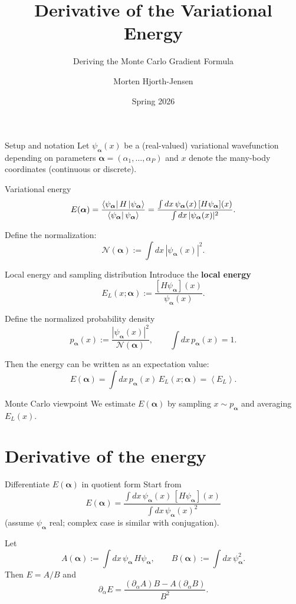 \documentclass[aspectratio=169]{beamer}
\title{Derivative of the Variational Energy}
\subtitle{Deriving the Monte Carlo Gradient Formula}
\author{Morten Hjorth-Jensen}
\date{Spring 2026}
\newcommand{\avg}[1]{\left\langle #1 \right\rangle}
\newcommand{\psia}{\psi_{\bm{\alpha}}}
\newcommand{\dalpha}{\partial_{\alpha}}
\newcommand{\El}{E_L}
\begin{document}
\begin{frame}
\titlepage
\end{frame}

\begin{frame}{Setup and notation}
Let $\psia(x)$ be a (real-valued) variational wavefunction depending on parameters
$\bm{\alpha}=(\alpha_1,\dots,\alpha_P)$ and $x$ denote the many-body coordinates (continuous or discrete).

\begin{block}{Variational energy}
\[
E(\bm{\alpha})=\frac{\bra{\psia}H\ket{\psia}}{\bra{\psia}\psia\rangle}
=
\frac{\int dx\, \psia(x)\, [H\psia](x)}{\int dx\, |\psia(x)|^2}.
\]
\end{block}

Define the normalization:
\[
\mathcal{N}(\bm{\alpha}) := \int dx\, |\psia(x)|^2.
\]
\end{frame}

\begin{frame}{Local energy and sampling distribution}
Introduce the \textbf{local energy}
\[
\El(x;\bm{\alpha}) := \frac{[H\psia](x)}{\psia(x)}.
\]

Define the normalized probability density
\[
p_{\bm{\alpha}}(x) := \frac{|\psia(x)|^2}{\mathcal{N}(\bm{\alpha})},
\qquad
\int dx\, p_{\bm{\alpha}}(x)=1.
\]

Then the energy can be written as an expectation value:
\[
E(\bm{\alpha}) = \int dx\, p_{\bm{\alpha}}(x)\, \El(x;\bm{\alpha})
= \avg{\El}.
\]

\begin{block}{Monte Carlo viewpoint}
We estimate $E(\bm{\alpha})$ by sampling $x\sim p_{\bm{\alpha}}$ and averaging $\El(x)$.
\end{block}
\end{frame}

\section{Derivative of the energy}

\begin{frame}{Differentiate $E(\bm{\alpha})$ in quotient form}
Start from
\[
E(\bm{\alpha})=\frac{\int dx\, \psia(x)\, [H\psia](x)}{\int dx\, \psia(x)^2}
\]
(assume $\psia$ real; complex case is similar with conjugation).

Let
\[
A(\bm{\alpha}) := \int dx\, \psia\, H\psia,
\qquad
B(\bm{\alpha}) := \int dx\, \psia^2.
\]
Then $E=A/B$ and
\[
\dalpha E = \frac{(\dalpha A)B - A(\dalpha B)}{B^2}.
\]
\end{frame}
\end{document}
